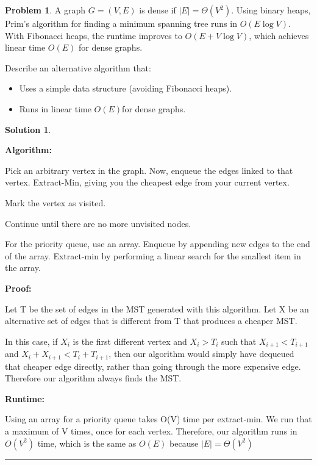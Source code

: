 \documentclass{article}
\theoremstyle{definition}
\newtheorem{problem}{Problem}
\def\fline{\rule{0.75\linewidth}{0.5pt}}
\newcommand{\finishline}{\begin{center}\fline\end{center}}
\newtheorem*{solution*}{Solution}
\newenvironment{solution}{\begin{solution*}}{{\finishline} \end{solution*}}
\begin{document}
\begin{problem}
A graph \( G = (V, E) \) is dense if \( |E| = \Theta(V^2) \). Using binary heaps, Prim's algorithm for finding a minimum spanning tree runs in \( O(E \log V) \). With Fibonacci heaps, the runtime improves to \( O(E + V \log V) \), which achieves linear time $O(E)$ for dense graphs.

Describe an alternative algorithm that:
\begin{itemize}
    \item Uses a simple data structure (avoiding Fibonacci heaps).
    \item Runs in linear time $O(E)$for dense graphs.
  \end{itemize}

\end{problem}


\begin{solution}
    \

    \textbf{Algorithm: }
    \
     
    Pick an arbitrary vertex in the graph. Now, enqueue the edges linked to that vertex. Extract-Min, giving you the cheapest edge from your current vertex.

    Mark the vertex as visited.

    Continue until there are no more unvisited nodes.

    For the priority queue, use an array. Enqueue by appending new edges to the end of the array. Extract-min by performing a linear search for the smallest item in the array.
    \

    \textbf{Proof: }
    \

    Let T be the set of edges in the MST generated with this algorithm. Let X be an alternative set of edges that is different from T that produces a cheaper MST. 

    In this case, if $X_i$ is the first different vertex and $X_i > T_i$ such that $X_{i+1} < T_{i+1}$ and $X_i + X_{i+1} < T_i + T_{i+1}$, then our algorithm would simply have dequeued that cheaper edge directly, rather than going through the more expensive edge. Therefore our algorithm always finds the MST. 
    \

    \textbf{Runtime: }
    \
    
    Using an array for a priority queue takes O(V) time per extract-min. We run that a maximum of V times, once for each vertex. Therefore, our algorithm runs in $O(V^2)$ time, which is the same as $O(E)$ because $|E| = \Theta(V^2)$

\end{solution}
\end{document}
